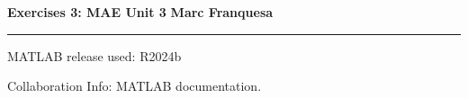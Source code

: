 \documentclass[a4paper,12pt]{report}
\begin{document}
{\Large{\textbf{Exercises 3: MAE Unit 3}} \hfill \textbf{Marc Franquesa}}
\hrule
\vspace{0.5cm}

MATLAB release used: R2024b

Collaboration Info: MATLAB documentation.

\bigskip

\begin{exlist}
    
\end{exlist}
\end{document}
